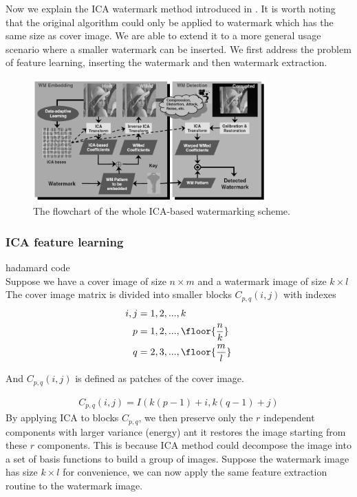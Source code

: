 Now we explain the ICA watermark method introduced in \cite{inproceedingsICA_watermark}. It is worth noting that the original algorithm could only be applied to watermark which has the same size as cover image. We are able to extend it to a more general usage scenario where a smaller watermark can be inserted. We first address the problem of feature learning, inserting the watermark and then watermark extraction.

\begin{figure}[H]
\centering
\includegraphics[width=0.8\textwidth]{images/ICA_flowchart_gray.png}
\caption{The flowchart of the whole ICA-based watermarking scheme. \cite{LuWei_ICA}}
\label{flow_ICA}
\end{figure}


\subsubsection{ICA feature learning}
hadamard code\\
Suppose we have a cover image of size $n\times m$ and a watermark image of size $k\times l$ The cover image matrix is divided into smaller blocks $C_{p,q}(i,j)$ with indexes
\begin{align}
    i,j &= 1,2,...,k\\
    p &= 1,2,...,\floor{\frac{n}{k}}\\ 
    q &= 2,3,...,\floor{\frac{m}{l}} 
\end{align}

And $C_{p,q}(i,j)$ is defined as patches of the cover image.

\begin{align}
    C_{p,q}(i,j) = I(k(p-1)+i, k(q-1)+j)
\end{align}
By applying ICA to blocks $C_{p,q}$, we then preserve only the $r$ independent components with larger variance (energy) ant it restores the image starting from these $r$ components. This is because ICA method could decompose the image into a set of basis functions to build a group of images. Suppose the watermark image has size $k \times l$ for convenience, we can now apply the same feature extraction routine to the watermark image.

